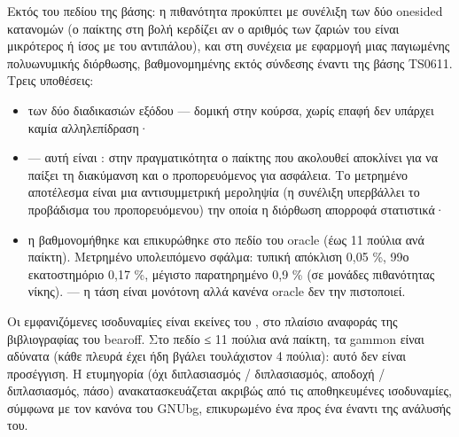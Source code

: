\documentclass[letterpaper,10pt,greek]{sphinxmanual}
\begin{document}
\sphinxAtStartPar
{} Εκτός του πεδίου της βάσης: η πιθανότητα προκύπτει με συνέλιξη των δύο one\sphinxhyphen{}sided κατανομών (ο παίκτης στη βολή κερδίζει αν ο αριθμός των ζαριών του είναι μικρότερος ή ίσος με του αντιπάλου), και στη συνέχεια με εφαρμογή μιας παγιωμένης πολυωνυμικής διόρθωσης, βαθμονομημένης εκτός σύνδεσης έναντι της βάσης TS\sphinxhyphen{}06\sphinxhyphen{}11. Τρεις υποθέσεις:
\begin{itemize}
\item {} 
\sphinxAtStartPar
{} των δύο διαδικασιών εξόδου — δομική στην κούρσα, χωρίς επαφή δεν υπάρχει καμία αλληλεπίδραση·

\item {} 
\sphinxAtStartPar
{} — αυτή είναι : στην πραγματικότητα ο παίκτης που ακολουθεί αποκλίνει για να παίξει τη διακύμανση και ο προπορευόμενος για ασφάλεια. Το μετρημένο αποτέλεσμα είναι μια αντισυμμετρική μεροληψία (η συνέλιξη υπερβάλλει το προβάδισμα του προπορευόμενου) την οποία η διόρθωση απορροφά στατιστικά·

\item {} 
\sphinxAtStartPar
η  βαθμονομήθηκε και επικυρώθηκε στο πεδίο του oracle (έως 11 πούλια ανά παίκτη). Μετρημένο υπολειπόμενο σφάλμα: τυπική απόκλιση 0,05 \%, 99ο εκατοστημόριο 0,17 \%, μέγιστο παρατηρημένο 0,9 \% (σε μονάδες πιθανότητας νίκης).  — η τάση είναι μονότονη αλλά κανένα oracle δεν την πιστοποιεί.

\end{itemize}

\sphinxAtStartPar
{} Οι εμφανιζόμενες ισοδυναμίες είναι εκείνες του , στο πλαίσιο αναφοράς της βιβλιογραφίας του bearoff. Στο πεδίο ≤ 11 πούλια ανά παίκτη, τα gammon είναι αδύνατα (κάθε πλευρά έχει ήδη βγάλει τουλάχιστον 4 πούλια): αυτό δεν είναι προσέγγιση. Η ετυμηγορία (όχι διπλασιασμός / διπλασιασμός, αποδοχή / διπλασιασμός, πάσο) ανακατασκευάζεται ακριβώς από τις αποθηκευμένες ισοδυναμίες, σύμφωνα με τον κανόνα του GNUbg, επικυρωμένο ένα προς ένα έναντι της ανάλυσής του.
\end{document}
